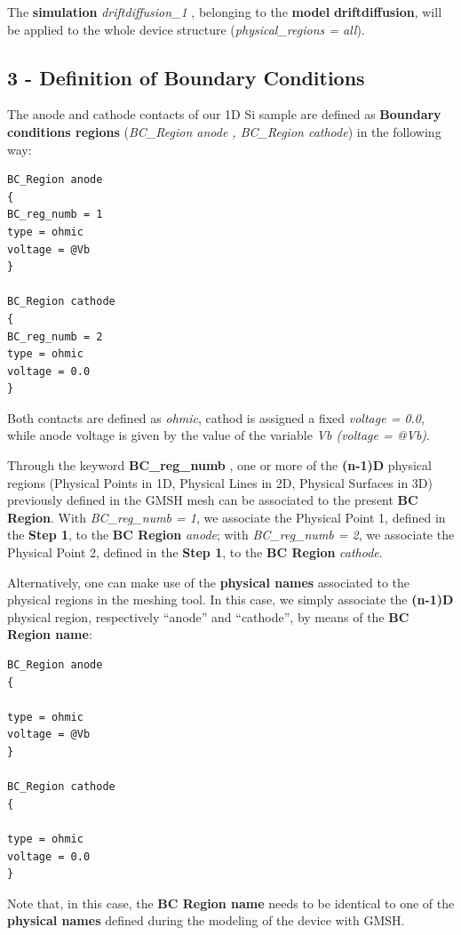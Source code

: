The \TiberCAD{} \textbf{simulation} \textit{driftdiffusion\_1} , belonging to the  \textbf{model} \textbf{driftdiffusion}, will be applied to the whole device structure (\textit{physical\_regions = all}).


\subsection* {3 - Definition of Boundary Conditions}
The anode and cathode contacts of our 1D Si sample are defined as \textbf{Boundary conditions regions} (\textit{BC\_Region anode , BC\_Region cathode}) in the following way:

\begin{verbatim}
BC_Region anode
{
BC_reg_numb = 1
type = ohmic
voltage = @Vb
}

BC_Region cathode
{
BC_reg_numb = 2
type = ohmic
voltage = 0.0
}
\end{verbatim}
Both contacts are defined as \textit{ohmic}, cathod is assigned a fixed \textit{voltage = 0.0}, while anode voltage is given by the value of the variable \textit{Vb (voltage = @Vb)}.

Through the keyword  \textbf{BC\_reg\_numb} , one or more of the \textbf{(n-1)D} physical regions (Physical Points in 1D, Physical Lines in 2D, Physical Surfaces in 3D) previously defined in the GMSH mesh can be associated to the present  \TiberCAD{} \textbf{BC Region}.
With \textit{BC\_reg\_numb = 1}, we associate the Physical Point 1, defined in the \textbf{Step 1}, to the \TiberCAD{} \textbf{BC Region} \textit{anode}; with \textit{BC\_reg\_numb = 2}, we associate the Physical Point 2, defined in the \textbf{Step 1}, to the \TiberCAD{} \textbf{BC Region} \textit{cathode}.

Alternatively, one can make  use  of  the  \textbf{physical names} associated to the physical regions in the  meshing  tool.
In  this  case, we  simply associate the  \textbf{(n-1)D} physical region,  respectively  ``anode'' and  ``cathode'',  by  means  of  the  \TiberCAD{} \textbf{BC Region name}:

 \begin{verbatim}
BC_Region anode
{

type = ohmic
voltage = @Vb
}

BC_Region cathode
{

type = ohmic
voltage = 0.0
}
\end{verbatim}

Note that, in  this  case, the \TiberCAD{} \textbf{BC Region name} needs to  be  identical to  one of the  \textbf{physical names} defined during the  modeling of the  device  with   GMSH.



